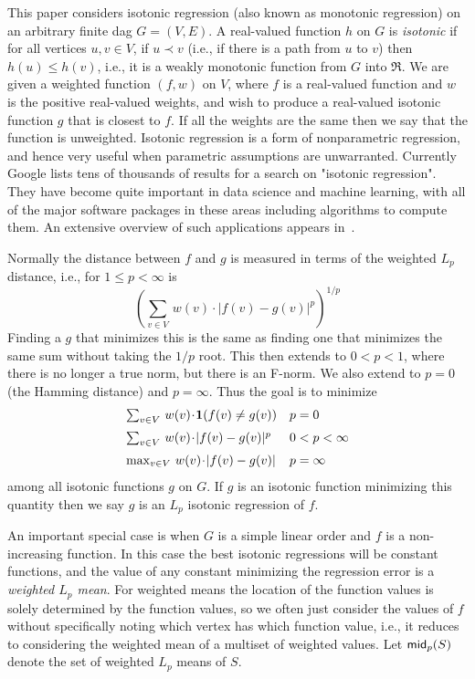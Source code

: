 \documentclass[11pt]{article}
\newcommand{\wmean}[2]{\ensuremath{\mathsf{mid}_{#1}\ifthenelse{\equal{#2}{}}{}{(#2)}}}
\begin{document}
This paper considers isotonic regression (also known as monotonic regression) on an arbitrary finite dag $G=(V,E)$.
A real-valued function $h$ on $G$ is \textit{isotonic} if for all vertices $u, v \in V$, if $u \prec v$ (i.e., if there is a path from $u$ to $v$) then $h(u) \leq h(v)$, i.e., it is a weakly monotonic function from $G$ into $\Re$.
We are given a weighted function $(f,w)$ on $V$, where $f$ is a real-valued function and $w$ is the positive real-valued weights, and wish to produce a real-valued isotonic function $g$ that is closest to $f$.
If all the weights are the same then we say that the function is unweighted.
Isotonic regression is a form of nonparametric regression, and hence very useful when parametric assumptions are unwarranted.
Currently Google lists tens of thousands of results for a search on "isotonic regression".
They have become quite important in data science and machine learning, with all of the major software packages in these areas including algorithms to compute them.
An extensive overview of such applications appears in~\cite{Canoetal_MonoClass19}.

Normally the distance between $f$ and $g$ is measured in terms of the weighted $L_p$ distance, i.e., for $1 \leq p < \infty$ is
$$
(\sum_{v \in V}\, w(v) \!\cdot\! |f(v) - g(v)|^p)^{1/p} 
$$
Finding a $g$ that minimizes this is the same as finding one that minimizes the same sum without taking the $1/p$ root.
This then extends to $0 < p < 1$, where there is no longer a true norm, but there is an F-norm.
We also extend to $p=0$ (the Hamming distance) and $p=\infty$.
Thus  the goal is to minimize
$$
\begin{array}{ll}
\sum_{v \in V}\, w(v) \!\cdot\! \mathbf{1}(f(v) \neq g(v)) & p=0 \medskip \\
 \sum_{v \in V}\, w(v) \!\cdot\! |f(v) - g(v)|^p & 0 <  p  < \infty \medskip \\ 
  \max_{v \in V}\, w(v) \!\cdot\! |f(v) - g(v)|  & p=\infty\\
\end{array}
$$
among all isotonic functions $g$ on $G$.
If $g$ is an isotonic function minimizing this quantity then we say $g$ is an $L_p$ isotonic regression of $f$.

An important special case is when $G$ is a simple linear order and $f$ is a non-increasing function.
In this case the best isotonic regressions will be constant functions, and the value of any constant minimizing the regression error is a \textit{weighted $L_p$ mean}.
For weighted means the location of the function values is solely determined by the function values, so we often just consider the values of $f$ without specifically noting which vertex has which function value, i.e., it reduces to considering the weighted mean of a multiset of weighted values.
Let \wmean{p}{S} denote the set of weighted $L_p$ means of $S$.
\end{document}
